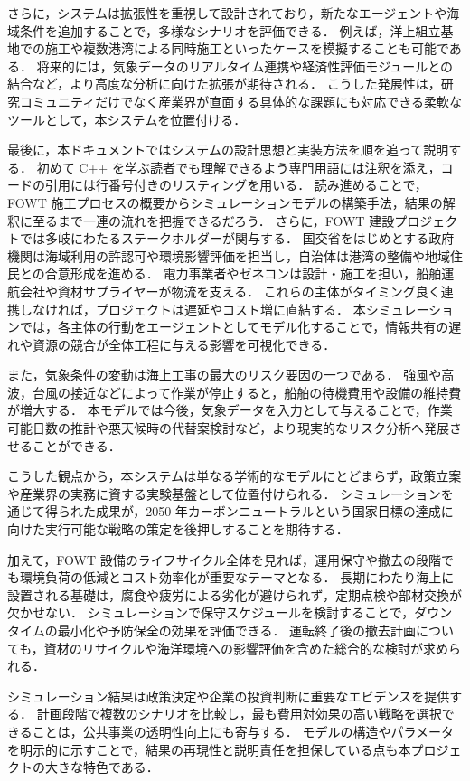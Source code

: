 \documentclass[10pt,letterpaper]{jsarticle}
\begin{document}
さらに，システムは拡張性を重視して設計されており，新たなエージェントや海域条件を追加することで，多様なシナリオを評価できる．
例えば，洋上組立基地での施工や複数港湾による同時施工といったケースを模擬することも可能である．
将来的には，気象データのリアルタイム連携や経済性評価モジュールとの結合など，より高度な分析に向けた拡張が期待される．
こうした発展性は，研究コミュニティだけでなく産業界が直面する具体的な課題にも対応できる柔軟なツールとして，本システムを位置付ける．

最後に，本ドキュメントではシステムの設計思想と実装方法を順を追って説明する．
初めて C++ を学ぶ読者でも理解できるよう専門用語には注釈を添え，コードの引用には行番号付きのリスティングを用いる．
読み進めることで，FOWT 施工プロセスの概要からシミュレーションモデルの構築手法，結果の解釈に至るまで一連の流れを把握できるだろう．
さらに，FOWT 建設プロジェクトでは多岐にわたるステークホルダーが関与する．
国交省をはじめとする政府機関は海域利用の許認可や環境影響評価を担当し，自治体は港湾の整備や地域住民との合意形成を進める．
電力事業者やゼネコンは設計・施工を担い，船舶運航会社や資材サプライヤーが物流を支える．
これらの主体がタイミング良く連携しなければ，プロジェクトは遅延やコスト増に直結する．
本シミュレーションでは，各主体の行動をエージェントとしてモデル化することで，情報共有の遅れや資源の競合が全体工程に与える影響を可視化できる．

また，気象条件の変動は海上工事の最大のリスク要因の一つである．
強風や高波，台風の接近などによって作業が停止すると，船舶の待機費用や設備の維持費が増大する．
本モデルでは今後，気象データを入力として与えることで，作業可能日数の推計や悪天候時の代替案検討など，より現実的なリスク分析へ発展させることができる．

こうした観点から，本システムは単なる学術的なモデルにとどまらず，政策立案や産業界の実務に資する実験基盤として位置付けられる．
シミュレーションを通じて得られた成果が，2050 年カーボンニュートラルという国家目標の達成に向けた実行可能な戦略の策定を後押しすることを期待する．

加えて，FOWT 設備のライフサイクル全体を見れば，運用保守や撤去の段階でも環境負荷の低減とコスト効率化が重要なテーマとなる．
長期にわたり海上に設置される基礎は，腐食や疲労による劣化が避けられず，定期点検や部材交換が欠かせない．
シミュレーションで保守スケジュールを検討することで，ダウンタイムの最小化や予防保全の効果を評価できる．
運転終了後の撤去計画についても，資材のリサイクルや海洋環境への影響評価を含めた総合的な検討が求められる．

シミュレーション結果は政策決定や企業の投資判断に重要なエビデンスを提供する．
計画段階で複数のシナリオを比較し，最も費用対効果の高い戦略を選択できることは，公共事業の透明性向上にも寄与する．
モデルの構造やパラメータを明示的に示すことで，結果の再現性と説明責任を担保している点も本プロジェクトの大きな特色である．
\end{document}
